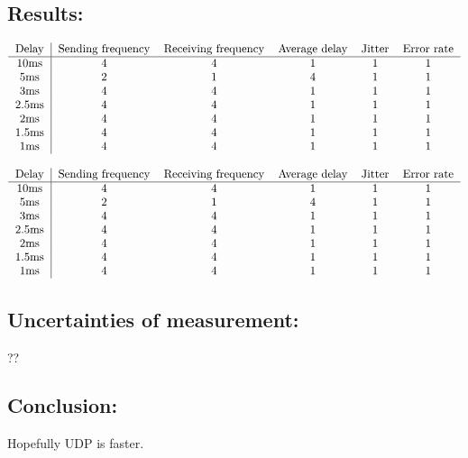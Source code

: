 \subsection*{Results:}
\begin{center}
	$\begin{tabular}{c|ccccc}
		Delay & \text{Sending frequency} & \text{Receiving frequency} & \text{Average delay} & Jitter & \text{Error rate}\\
		\hline
		10ms & 4 & 4 & 1 & 1 & 1 \\
		5ms & 2 & 1 & 4 & 1 & 1 \\
		3ms & 4 & 4 & 1 & 1 & 1 \\
		2.5ms & 4 & 4 & 1 & 1 & 1 \\
		2ms & 4 & 4 & 1 & 1 & 1 \\
		1.5ms & 4 & 4 & 1 & 1 & 1 \\
		1ms & 4 & 4 & 1 & 1 & 1 \\
	\end{tabular}$
\end{center}

\begin{center}
	$\begin{tabular}{c|ccccc}
		Delay & \text{Sending frequency} & \text{Receiving frequency} & \text{Average delay} & Jitter & \text{Error rate}\\
		\hline
		10ms & 4 & 4 & 1 & 1 & 1 \\
		5ms & 2 & 1 & 4 & 1 & 1 \\
		3ms & 4 & 4 & 1 & 1 & 1 \\
		2.5ms & 4 & 4 & 1 & 1 & 1 \\
		2ms & 4 & 4 & 1 & 1 & 1 \\
		1.5ms & 4 & 4 & 1 & 1 & 1 \\
		1ms & 4 & 4 & 1 & 1 & 1 \\
	\end{tabular}$
\end{center}

\subsection*{Uncertainties of measurement:}

??

\subsection*{Conclusion:}

Hopefully UDP is faster.